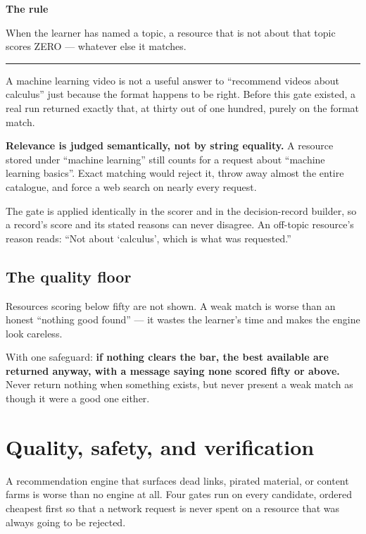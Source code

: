 \documentclass[11pt,a4paper]{article}
\newenvironment{callout}[1]
  {\par\vspace{8pt}\noindent
   \begin{lrbox}{\calloutbox}
   \begin{minipage}{\dimexpr\textwidth-2\fboxsep-8pt\relax}
   \vspace{4pt}
   {\bfseries\color{navy}#1}\par\vspace{4pt}}
  {\vspace{4pt}\end{minipage}%
   \end{lrbox}%
   \noindent\textcolor{navy}{\rule[-\dp\calloutbox]{3pt}{\dimexpr\ht\calloutbox+\dp\calloutbox\relax}}%
   \colorbox{headshade}{\usebox{\calloutbox}}%
   \par\vspace{10pt}}
\begin{document}
\begin{callout}{The rule}
When the learner has named a topic, a resource that is not about that topic
scores ZERO --- whatever else it matches.
\end{callout}

A machine learning video is not a useful answer to ``recommend videos about
calculus'' just because the format happens to be right. Before this gate
existed, a real run returned exactly that, at thirty out of one hundred,
purely on the format match.

\textbf{Relevance is judged semantically, not by string equality.} A resource
stored under ``machine learning'' still counts for a request about ``machine
learning basics''. Exact matching would reject it, throw away almost the
entire catalogue, and force a web search on nearly every request.

The gate is applied identically in the scorer and in the decision-record
builder, so a record's score and its stated reasons can never disagree. An
off-topic resource's reason reads: ``Not about `calculus', which is what was
requested.''

\subsection{The quality floor}

Resources scoring below fifty are not shown. A weak match is worse than an
honest ``nothing good found'' --- it wastes the learner's time and makes the
engine look careless.

With one safeguard: \textbf{if nothing clears the bar, the best available are
returned anyway, with a message saying none scored fifty or above.} Never
return nothing when something exists, but never present a weak match as though
it were a good one either.

\newpage
\section{Quality, safety, and verification}

A recommendation engine that surfaces dead links, pirated material, or content
farms is worse than no engine at all. Four gates run on every candidate,
ordered cheapest first so that a network request is never spent on a resource
that was always going to be rejected.
\end{document}

